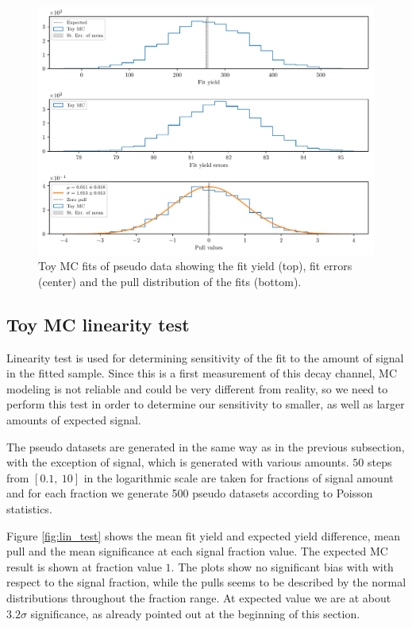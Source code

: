 \begin{figure}[H]
	\centering
	\captionsetup{width=0.8\linewidth}
	\includegraphics[width=\linewidth]{fig/toyMC}
	\caption{Toy MC fits of pseudo data showing the fit yield (top), fit errors (center) and the pull distribution of the fits (bottom).}
	\label{fig:toyMC}
\end{figure}

\subsection{Toy MC linearity test}
Linearity test is used for determining sensitivity of the fit to the amount of signal in the fitted sample. Since this is a first measurement of this decay channel, MC modeling is not reliable and could be very different from reality, so we need to perform this test in order to determine our sensitivity to smaller, as well as larger amounts of expected signal.

The pseudo datasets are generated in the same way as in the previous subsection, with the exception of signal, which is generated with various amounts. $50$ steps from $[0.1,~10]$ in the logarithmic scale are taken for fractions of signal amount and for each fraction we generate 500 pseudo datasets according to Poisson statistics.

Figure \ref{fig:lin_test} shows the mean fit yield and expected yield difference, mean pull and the mean significance at each signal fraction value. The expected MC result is shown at fraction value $1$. The plots show no significant bias with with respect to the signal fraction, while the pulls seems to be described by the normal distributions throughout the fraction range. At expected value we are at about $3.2\sigma$ significance, as already pointed out at the beginning of this section.

